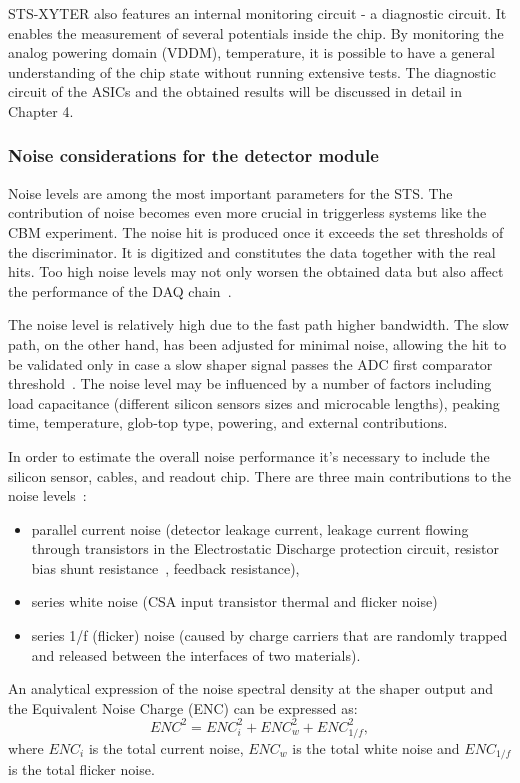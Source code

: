 STS-XYTER also features an internal monitoring circuit - a diagnostic circuit. It enables the measurement of several potentials inside the chip. By monitoring the analog powering domain (VDDM), temperature, it is possible to have a general understanding of the chip state without running extensive tests. The diagnostic circuit of the \glspl{ASIC} and the obtained results will be discussed in detail in Chapter 4.
\subsubsection{Noise considerations for the detector module}
Noise levels are among the most important parameters for the \gls{STS}. The contribution of noise becomes even more crucial in triggerless systems like the \gls{CBM} experiment. The noise hit is produced once it exceeds the set thresholds of the discriminator. It is digitized and constitutes the data together with the real hits. Too high noise levels may not only worsen the obtained data but also affect the performance of the \gls{DAQ} chain~\cite{Heuser:54798}.

The noise level is relatively high due to the fast path higher bandwidth. The slow path, on the other hand, has been adjusted for minimal noise, allowing the hit to be validated only in case a slow shaper signal passes the ADC first comparator threshold~\cite{RodriguezRodriguez2020}. The noise level may be influenced by a number of factors including load capacitance 
(different silicon sensors sizes and microcable lengths), peaking time, temperature, glob-top type, powering, and external contributions.

In order to estimate the overall noise performance it's necessary to include the silicon sensor, cables, and readout chip. There are three main contributions to the noise levels~\cite{Toia:209729}:
\begin{itemize}
    \item parallel current noise (detector leakage current, leakage current flowing through transistors in the Electrostatic Discharge protection circuit, resistor bias shunt resistance~\cite{Spieler}, feedback resistance),
    \item series white noise (\gls{CSA} input transistor thermal and flicker noise)
    \item series 1/f (flicker) noise (caused by charge carriers that are randomly trapped and released between the interfaces of two materials).
\end{itemize}
An analytical expression of the noise spectral density at the shaper output and the Equivalent Noise Charge (\gls{ENC}) can be expressed as:
\begin{equation}
    ENC^{2} = ENC^{2}_{i} + ENC^{2}_{w} + ENC^{2}_{1/f},
\end{equation}
where $ENC_{i}$  is the total current noise, $ ENC_{w}$ is the total white noise and $ENC_{1/f}$ is the total flicker noise. 

